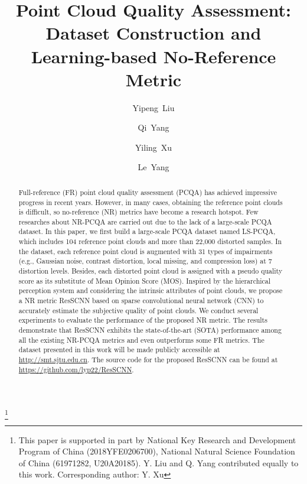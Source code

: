 \documentclass[acmsmall]{acmart}
\begin{document}
\title{Point Cloud Quality Assessment: Dataset Construction and Learning-based No-Reference Metric}



\author{Yipeng~Liu}
\author{Qi~Yang}
\author{Yiling~Xu}
\author{Le~Yang}

\thanks{This paper is supported in part by National Key Research and Development Program of China (2018YFE0206700), National Natural Science Foundation of China (61971282, U20A20185). Y. Liu and Q. Yang contributed equally to this work. Corresponding author: Y. Xu}


\begin{abstract}
\par Full-reference (FR) point cloud quality assessment (PCQA) has achieved impressive progress in recent years. However, in many cases, obtaining the reference point clouds is difficult, so no-reference (NR) metrics have become a research hotspot. Few researches about NR-PCQA are carried out due to the lack of a large-scale PCQA dataset. In this paper, we first build a large-scale PCQA dataset named LS-PCQA, which includes 104 reference point clouds and more than 22,000 distorted samples. In the dataset, each reference point cloud is augmented with 31 types of impairments (e.g., Gaussian noise, contrast distortion, local missing, and compression loss) at 7 distortion levels. Besides, each distorted point cloud is assigned with a pseudo quality score as its substitute of Mean Opinion Score (MOS). Inspired by the hierarchical perception system and considering the intrinsic attributes of point clouds, we propose a NR metric ResSCNN based on sparse convolutional neural network (CNN) to accurately estimate the subjective quality of point clouds. We conduct several experiments to evaluate the performance of the proposed NR metric. The results demonstrate that ResSCNN exhibits the state-of-the-art (SOTA) performance among all the existing NR-PCQA metrics and even outperforms some FR metrics. The dataset presented in this work will be made publicly accessible at {\url{http://smt.sjtu.edu.cn}}. The source code for the proposed ResSCNN can be found at {\url{https://github.com/lyp22/ResSCNN}}.
\end{abstract}
\end{document}
